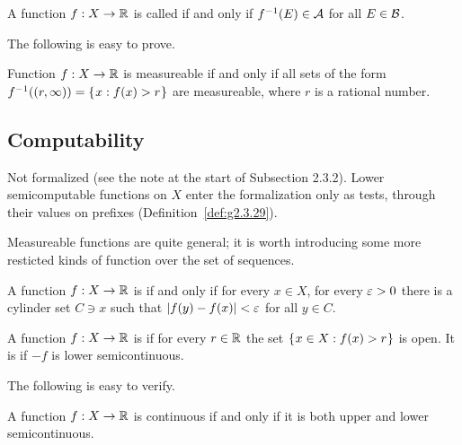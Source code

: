 \begin{definition}
  \label{def:g2.3.18}
  \notready
A function \( f:X\to \mathbb{R} \) is called  if and only if
\( f^{-1}(E)\in\mathcal{A} \) for all \( E\in\mathcal{B} \).
\end{definition}

The following is easy to prove.

\begin{proposition}
  \label{prop:g2.3.19}
  \notready
Function \( f:X\to\mathbb{R} \) is measureable if and only if all sets of the form
\( f^{-1}((r,\infty))=\mathopen\{\mskip 1mu x: f(x)>r\mskip 1mu\mathclose\} \) are measureable, where \( r \) is a
rational number.
\end{proposition}

\subsection{Computability}

\begin{formalization}
Not formalized (see the note at the start of Subsection 2.3.2). Lower semicomputable
functions on \( X \) enter the formalization only as tests, through their values on prefixes
(Definition~\ref{def:g2.3.29}).
\end{formalization}

Measureable functions are quite general; it is worth introducing some more
resticted kinds of function over the set of sequences.

\begin{definition}
  \label{def:g2.3.20}
  \notready
  A function \( f:X\to\mathbb{R} \) is  if and only if for every \( x\in X \), for
every \( \varepsilon>0 \) there is a cylinder set \( C\ni x \) such that \( |f(y)-f(x)|<\varepsilon \) for all
\( y\in C \).

  A function \( f:X\to\mathbb{R} \) is  if for every \( r\in\mathbb{R} \) the set
\( \mathopen\{\mskip 1mu x\in X: f(x)>r\mskip 1mu\mathclose\} \) is open.
 It is  if \( -f \) is lower semicontinuous.
\end{definition}

The following is easy to verify.

\begin{proposition}
  \label{prop:g2.3.21}
  \notready
A function \( f:X\to\mathbb{R} \) is continuous if and only if it is both upper and lower semicontinuous.
\end{proposition}

